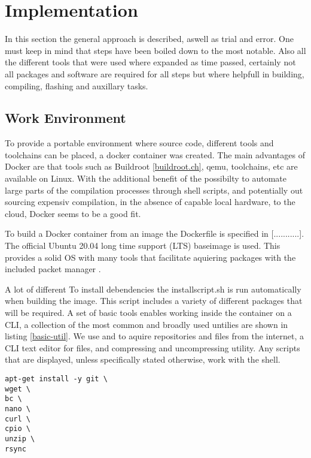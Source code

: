 \chapter{Implementation}

In this section the general approach is described, aswell as trial and error. One must keep in mind that steps have been boiled down to the most notable. Also all the different tools that were used where expanded as time passed, certainly not all packages and software are required for all steps but where helpfull in building, compiling, flashing and auxillary tasks. 

\section{Work Environment}\label{envsetup.ch}
To provide a portable environment where source code, different tools and toolchains can be placed, a docker container was created. The main advantages of Docker are that tools such as Buildroot \ref{buildroot.ch}, qemu, toolchains, etc are available on Linux. With the additional benefit of the possibilty to automate large parts of the compilation processes through shell scripts, and potentially out sourcing expensiv compilation, in the absence of capable local hardware, to the cloud, Docker seems to be a good fit.

To build a Docker container from an image the Dockerfile is specified in [...........]. The official Ubuntu 20.04 long time support (LTS) baseimage is used. This provides a solid OS with many tools that facilitate aquiering packages with the included packet manager . 

A lot of different To install debendencies the installscript.sh is run automatically when building the image. This script includes a variety of different packages that will be required. A set of basic tools enables working inside the container on a CLI, a collection of the most common and broadly used untilies are shown in listing \ref{basic-util}. We use  and  to aquire repositories and files from the internet, a CLI text editor for  files, and compressing and uncompressing utility. Any scripts that are displayed, unless specifically stated otherwise, work with the  shell.

\begin{lstlisting}[style=SH, caption=Installing basic utility, label=basic-util, float, floatplacement=H]
apt-get install -y git \
wget \
bc \
nano \
curl \
cpio \
unzip \
rsync
\end{lstlisting}

